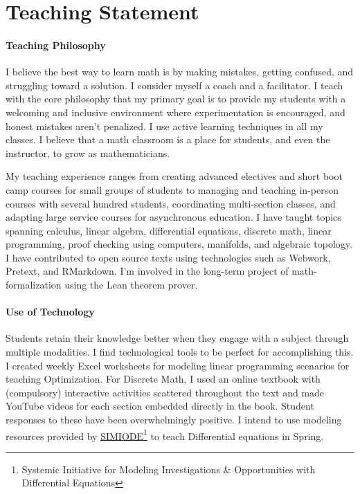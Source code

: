 \documentclass[
]{report}
\begin{document}
\hypertarget{teaching-statement}{%
\chapter{Teaching Statement}\label{teaching-statement}}

\hypertarget{teaching-philosophy}{%
\subsubsection*{Teaching Philosophy}\label{teaching-philosophy}}


I believe the best way to learn math is by making mistakes, getting confused, and struggling toward a solution. I consider myself a coach and a facilitator. I teach with the core philosophy that my primary goal is to provide my students with a welcoming and inclusive environment where experimentation is encouraged, and honest mistakes aren't penalized. I use active learning techniques in all my classes. I believe that a math classroom is a place for students, and even the instructor, to grow as mathematicians.

My teaching experience ranges from creating advanced electives and short boot camp courses for small groups of students to managing and teaching in-person courses with several hundred students, coordinating multi-section classes, and adapting large service courses for asynchronous education. I have taught topics spanning calculus, linear algebra, differential equations, discrete math, linear programming, proof checking using computers, manifolds, and algebraic topology. I have contributed to open source texts using technologies such as Webwork, Pretext, and RMarkdown. I'm involved in the long-term project of math-formalization using the Lean theorem prover.

\hypertarget{use-of-technology}{%
\subsubsection*{Use of Technology}\label{use-of-technology}}


Students retain their knowledge better when they engage with a subject through multiple modalities. I find technological tools to be perfect for accomplishing this. I created weekly Excel worksheets for modeling linear programming scenarios for teaching Optimization. For Discrete Math, I used an online textbook with (compulsory) interactive activities scattered throughout the text and made YouTube videos for each section embedded directly in the book. Student responses to these have been overwhelmingly positive.
I intend to use modeling resources provided by \href{https://qubeshub.org/community/groups/simiode}{SIMIODE}\footnote{Systemic Initiative for Modeling Investigations \& Opportunities with Differential Equations} to teach Differential equations in Spring.
\end{document}
